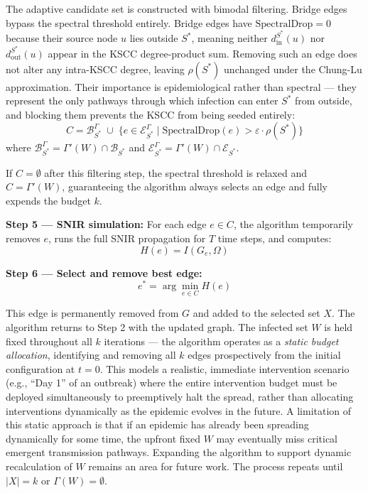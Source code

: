 \documentclass[conference]{IEEEtran}
\begin{document}
The adaptive candidate set is constructed with bimodal filtering. Bridge edges bypass the spectral threshold entirely. Bridge edges have $\mathrm{SpectralDrop} = 0$ because their source node $u$ lies outside $S^*$, meaning neither $d_{\mathrm{in}}^{S^*}(u)$ nor $d_{\mathrm{out}}^{S^*}(u)$ appear in the KSCC degree-product sum. Removing such an edge does not alter any intra-KSCC degree, leaving $\rho(S^*)$ unchanged under the Chung-Lu approximation. Their importance is epidemiological rather than spectral — they represent the only pathways through which infection can enter $S^*$ from outside, and blocking them prevents the KSCC from being seeded entirely:
\begin{equation}
C = \mathcal{B}_{S^*}^{\Gamma} \;\cup\; \{e \in \mathcal{E}_{S^*}^{\Gamma} \mid \mathrm{SpectralDrop}(e) > \varepsilon \cdot \rho(S^*)\}
\end{equation}
where $\mathcal{B}_{S^*}^{\Gamma} = \Gamma'(W) \cap \mathcal{B}_{S^*}$ and $\mathcal{E}_{S^*}^{\Gamma} = \Gamma'(W) \cap \mathcal{E}_{S^*}$.

If $C = \emptyset$ after this filtering step, the spectral threshold is relaxed and $C = \Gamma'(W)$, guaranteeing the algorithm always selects an edge and fully expends the budget $k$.

\vspace{0.5em}

\textbf{Step 5 — SNIR simulation:}  
For each edge $e \in C$, the algorithm temporarily removes $e$, runs the full SNIR propagation for $T$ time steps, and computes:
\begin{equation}
H(e) = I(G_e, \Omega)
\end{equation}

\vspace{0.5em}

\textbf{Step 6 — Select and remove best edge:}  
\begin{equation}
e^* = \arg\min_{e \in C} H(e)
\end{equation}

This edge is permanently removed from $G$ and added to the selected set $X$. The algorithm returns to Step 2 with the updated graph. The infected set $W$ is held fixed throughout all $k$ iterations — the algorithm operates as a \emph{static budget allocation}, identifying and removing all $k$ edges prospectively from the initial configuration at $t=0$. This models a realistic, immediate intervention scenario (e.g., ``Day 1'' of an outbreak) where the entire intervention budget must be deployed simultaneously to preemptively halt the spread, rather than allocating interventions dynamically as the epidemic evolves in the future. A limitation of this static approach is that if an epidemic has already been spreading dynamically for some time, the upfront fixed $W$ may eventually miss critical emergent transmission pathways. Expanding the algorithm to support dynamic recalculation of $W$ remains an area for future work. The process repeats until $|X| = k$ or $\Gamma(W) = \emptyset$.
\end{document}
